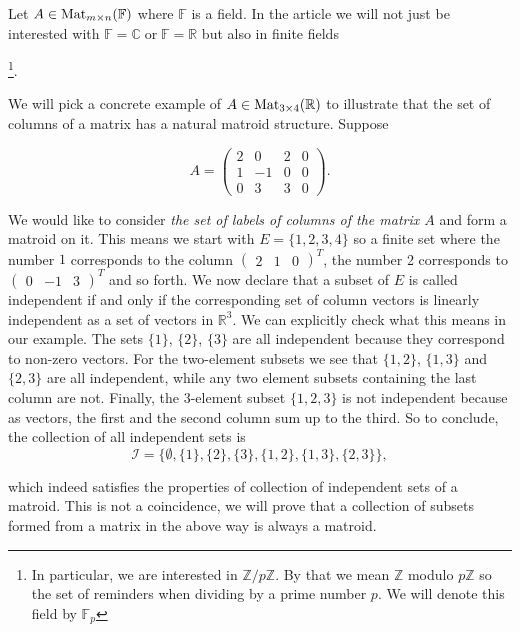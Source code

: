 Let $A \in \operatorname{Mat}_{m \times n}(\mathbb{F})$ where $\mathbb{F}$ is a field. In the article we will not just be interested with $\mathbb{F} = \mathbb{C} \; \mathrm{or}\; \mathbb{F} = \mathbb{R} $ but also in finite fields 

 
 \footnote{In particular, we are interested in $\mathbb{Z} / p\mathbb{Z}$. By that we mean $\mathbb{Z}$ modulo $p\mathbb{Z}$ so the set of reminders when dividing by a prime number $p$. We will denote this field by $\mathbb{F}_p$}.

\begin{exmp}
    

 
 We will pick a concrete example of $A \in  \operatorname{Mat}_{3 \times 4}(\mathbb{R})$ to illustrate that the set of columns of a matrix has a natural matroid structure. Suppose

$$A = \begin{pmatrix}

2 & 0 & 2 & 0 \\
1 & -1 & 0 & 0 \\
0 & 3 & 3 & 0


\end{pmatrix}.$$

We would like to consider \textit{the set of labels of columns of the matrix $A$} and form a matroid on it. This means we start with $E = \{1,2,3,4\}$ so a finite set where the number $1$ corresponds to the column $\begin{pmatrix} 2 & 1 & 0 \end{pmatrix} ^ T$, the number 2 corresponds to $\begin{pmatrix}  0 & -1 & 3  \end{pmatrix} ^ T$ and so forth. We now declare that a subset of $E$ is called independent if and only if the corresponding set of column vectors is linearly independent as a set of vectors in $\mathbb{R}^3$. We can explicitly check what this means in our example. The sets $\{1\}$, $\{2\}$, $\{3\}$ are all independent because they correspond to non-zero vectors. For the two-element subsets we see that $\{1,2\}$, $\{1,3\}$ and $\{2,3\}$ are all independent, while any two element subsets containing the last column are not. Finally, the 3-element subset $\{1,2,3\}$ is not independent because as vectors, the first and the second column sum up to the third. So to conclude, the collection of all independent sets is
$$\mathcal{I} = \{\emptyset, \{1\}, \{2\}, \{3\}, \{1,2\}, \{1,3\}, \{2,3\} \},$$

which indeed satisfies the properties of collection of independent sets of a matroid. This is not a coincidence, we will prove that a collection of subsets formed from a matrix in the above way is always a matroid.

\end{exmp}


